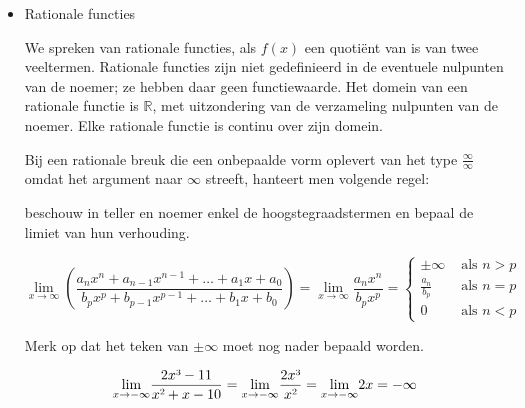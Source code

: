 \begin{itemize}
\item{Rationale functies}

We spreken van rationale functies, als $f(x)$ een quoti\"ent
van is van twee veeltermen. Rationale functies zijn niet gedefinieerd
in de eventuele nulpunten van de noemer; ze hebben daar geen functiewaarde.
Het domein van een rationale functie is $\mathbb{R}$, met uitzondering
van de verzameling nulpunten van de noemer. Elke rationale functie
is continu over zijn domein.

Bij een rationale breuk die een onbepaalde vorm oplevert
van het type $\frac{\infty}{\infty}$ omdat het argument naar $\infty$
streeft, hanteert men volgende regel: 

beschouw in teller en noemer enkel de hoogstegraadstermen en bepaal
de limiet van hun verhouding.



\begin{equation*}
{\displaystyle \lim_{x\to\infty}}\left(\frac{a_{n}x^{n}+a_{n-1}x^{n-1}+\ldots+a_{1}x+a_{0}}{b_{p}x^{p}+b_{p-1}x^{p-1}+\ldots+b_{1}x+b_{0}}\right)={\displaystyle \lim_{x\to\infty}}{\displaystyle \frac{a_{n}x^{n}}{b_{p}x^{p}}} = 
\left\{
\begin{array}{ll}
\pm\infty &\text{ als } n>p \\
\frac{a_n}{b_p} &\text{ als } n=p \\
0 &\text{ als } n<p
\end{array}
\right.
\end{equation*}


Merk op dat het teken van $\pm\infty$ moet nog nader bepaald worden.

\begin{voorbeeld}
	
\begin{equation*}
{\displaystyle \lim_{x\to-\infty}}{\displaystyle \frac{2x\text{\textthreesuperior}-11}{x\text{\texttwosuperior}+x-10}}={\displaystyle \lim_{x\to-\infty}}{\displaystyle \frac{2x\text{\textthreesuperior}}{x\text{\texttwosuperior}}}={\displaystyle \lim_{x\to-\infty}}2x=-\infty
\end{equation*}


\end{voorbeeld}
\end{itemize}
